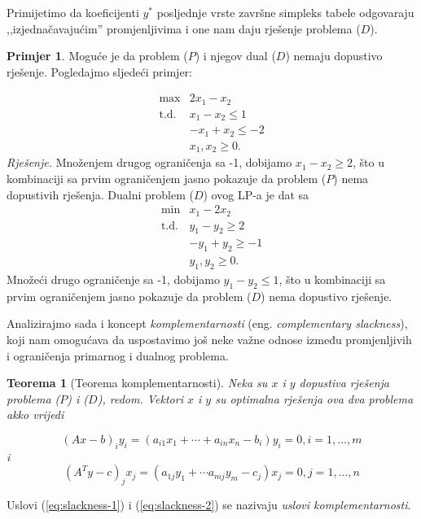 \documentclass[b5paper, utf8, 11pt, colorlinks]{book}
\newtheorem{thm}{Teorema}[chapter]
\theoremstyle{definition}
\newtheorem{primjer}{Primjer}[chapter]
\begin{document}
Primijetimo da koeficijenti $y^*$ posljednje vrste završne simpleks tabele odgovaraju  ,,izjednačavajućim''   promjenljivima i one nam daju rješenje problema  ($D$).  

\begin{primjer} Moguće je da problem ($P$) i njegov   dual ($D$) nemaju dopustivo rješenje. Pogledajmo sljedeći primjer:
\end{primjer}
$$\begin{array}{cl}
	\max          & 2 x_1 - x_2 \\
	{\mbox{t.d.} }      & x_1 - x_2 \leq 1 \\
	& -x_1 + x_2 \leq -2 \\
	& x_1, x_2 \geq 0.
\end{array}$$
\emph{Rješenje.} Množenjem drugog ograničenja sa -1, dobijamo $x_1 - x_2 \geq 2$, što u kombinaciji sa prvim ograničenjem jasno pokazuje da problem ($P$) nema dopustivih rješenja. Dualni problem ($D$) ovog LP-a je dat sa 
$$\begin{array}{cl}
	\min          &x_1 - 2x_2 \\
	{\mbox{t.d.} }       & y_1 -y_2 \geq 2 \\
	& -y_1 + y_2 \geq -1 \\
	& y_1, y_2 \geq 0.
\end{array}$$
Množeći drugo ograničenje sa -1, dobijamo $y_1 -y_2 \leq 1$, što u kombinaciji sa prvim ograničenjem jasno pokazuje da problem ($D$) nema dopustivo rješenje. ~

Analizirajmo sada i koncept  \emph{komplementarnosti} (eng. \emph{complementary slackness}), koji nam omogućava da uspostavimo još neke važne odnose između promjenljivih i ograničenja primarnog i dualnog problema. 
\begin{thm}[Teorema komplementarnosti]
	
	Neka su $x$ i $y$ dopustiva rješenja problema ($P$) i  ($D$), redom. Vektori $x$ i $y$ su optimalna rješenja ova dva problema akko vrijedi 
	
	\begin{equation}\label{eq:slackness-2} 
		(Ax - b)_i y_i = (a_{i1}x_1 + \cdots + a_{in}x_n - b_i)y_i = 0, i=1,\ldots,m 
	\end{equation} 
	i 
	\begin{equation}\label{eq:slackness-1} 
		(A^Ty - c)_j x_j =  ( a_{1 j}y_1 + \cdots a_{m j}y_m - c_j  ) x_j =  
		0, j=1,\ldots,n 
	\end{equation}    
	
\end{thm} 
Uslovi (\ref{eq:slackness-1}) i (\ref{eq:slackness-2}) se nazivaju \emph{uslovi komplementarnosti}. 
\end{document}
